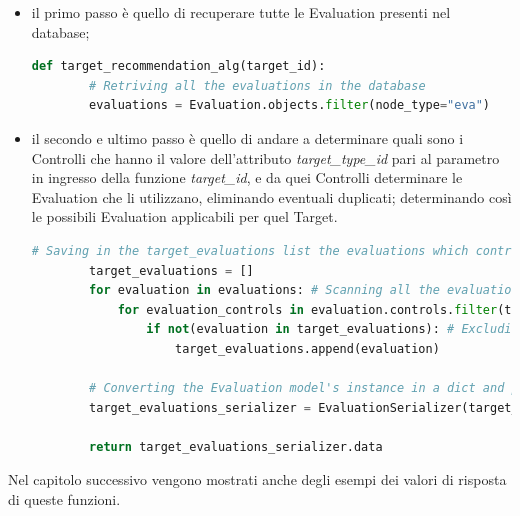 \begin{itemize}
    \item il primo passo è quello di recuperare tutte le Evaluation presenti nel database;
    \begin{lstlisting}[language=Python, label=lst:IB_CF_Target_1]
    def target_recommendation_alg(target_id):
        # Retriving all the evaluations in the database
        evaluations = Evaluation.objects.filter(node_type="eva")
    \end{lstlisting} 
    \item il secondo e ultimo passo è quello di andare a determinare quali sono i Controlli che hanno il valore dell'attributo \textit{target\_type\_id} 
    pari al parametro in ingresso della funzione \textit{target\_id}, e da quei Controlli determinare le Evaluation che li utilizzano, 
    eliminando eventuali duplicati; determinando così le possibili Evaluation applicabili per quel Target.
    \begin{lstlisting}[language=Python, label=lst:IB_CF_Target_2]
        # Saving in the target_evaluations list the evaluations which controls have target_type_id equal to target_id
        target_evaluations = []
        for evaluation in evaluations: # Scanning all the evaluations
            for evaluation_controls in evaluation.controls.filter(target_type_id=target_id):
                if not(evaluation in target_evaluations): # Excluding evaluations duplicated
                    target_evaluations.append(evaluation)
        
        # Converting the Evaluation model's instance in a dict and putting the evaluation, as a dict, in a list
        target_evaluations_serializer = EvaluationSerializer(target_evaluations, many=True)
        
        return target_evaluations_serializer.data
    \end{lstlisting} 
\end{itemize}
Nel capitolo successivo vengono mostrati anche degli esempi dei valori di risposta di queste funzioni.
%
